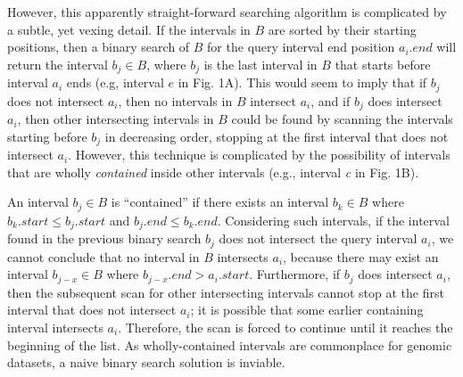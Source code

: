 \documentclass{bioinfo}
\begin{document}
        However, this apparently straight-forward searching algorithm is 
        complicated by a subtle, yet vexing detail. If the intervals in $B$ 
        are sorted by their starting positions, then a binary search of $B$ 
        for the query interval end position $a_i.end$ will return the 
        interval $b_j \in B$, where $b_j$ is the last interval in $B$ that 
        starts before interval $a_i$ ends (e.g, interval $e$ in Fig. 1A).  
        This would seem to imply that if $b_j$ does not intersect $a_i$, 
        then no intervals in $B$ intersect $a_i$, and if $b_j$ does intersect
        $a_i$, then other intersecting intervals in $B$ could be found by scanning the
        intervals starting before $b_j$ in decreasing order, stopping at the first
        interval that does not intersect $a_i$.  However, this technique is 
        complicated by the possibility of intervals that are wholly {\em contained} 
        inside other intervals (e.g., interval \emph{c} in Fig. 1B). 
        
        An interval $b_j\in B$ is ``contained'' if there exists an interval
        $b_k \in B$ where $b_k.start \leq b_j.start$ and $b_j.end \leq
        b_k.end$.  Considering such intervals, if the interval found in the
        previous binary search $b_j$ does not intersect the query interval
        $a_i$, we cannot conclude that no interval in $B$ intersects $a_i$,
        because there may exist an interval $b_{j-x} \in B$ where $b_{j-x}.end
        > a_i.start$.  Furthermore, if $b_j$ does intersect $a_i$, then the
        subsequent scan for other intersecting intervals cannot stop at the
        first interval that does not intersect $a_i$; it is possible that some
        earlier containing interval intersects $a_i$. Therefore, the scan is
        forced to continue until it reaches the beginning of the list. As 
        wholly-contained intervals are commonplace for genomic datasets,
        a naive binary search solution is inviable.
        
\end{document}
